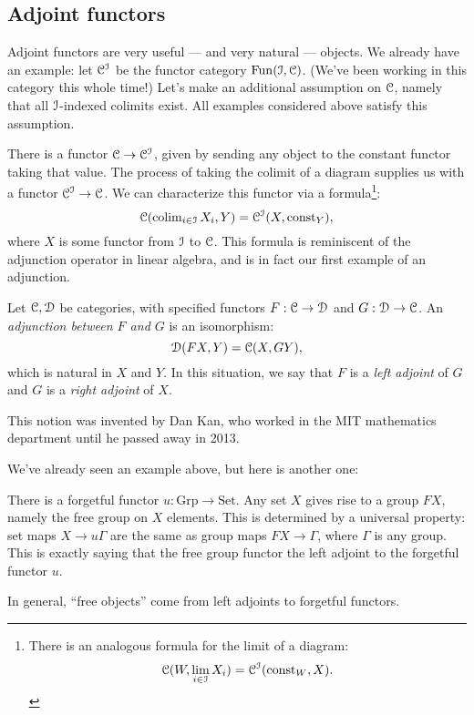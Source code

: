 \subsection{Adjoint functors}
Adjoint functors are very useful --- and very natural --- objects.
We already have an example: let $\mathcal C^\mathcal I$ be the functor category $\operatorname{Fun}(\mathcal I,\mathcal C)$.
(We've been working in this category this whole time!)
Let's make an additional assumption on $\mathcal C$, namely that all $\mathcal I$-indexed colimits exist.
All examples considered above satisfy this assumption.

There is a functor $\mathcal C\to \mathcal C^\mathcal I$, given by sending any object to the constant functor taking that value.
The process of taking the colimit of a diagram supplies us with a functor $\mathcal C^\mathcal I\to \mathcal C$.
We can characterize this functor via a formula\footnote{There is an analogous formula for the limit of a diagram:
$$\mathcal C(W,\lim_{i\in \mathcal I} X_i) = \mathcal C^{\mathcal I}(\mathrm{const}_W,X).$$}:
$$\mathcal C(\operatorname{colim}_{i\in \mathcal I} X_i,Y) = \mathcal C^\mathcal I(X,\mathrm{const}_Y),$$
where $X$ is some functor from $\mathcal I$ to $\mathcal C$.
This formula is reminiscent of the adjunction operator in linear algebra,
and is in fact our first example of an adjunction.

\begin{definition}
    Let $\mathcal C,\mathcal D$ be categories,
    with specified functors $F:\mathcal C\to \mathcal D$ and $G:\mathcal D\to\mathcal C$.
    An \emph{adjunction between $F$ and $G$} is an isomorphism:
    $$\mathcal D(FX,Y) = \mathcal C(X,GY),$$
    which is natural in $X$ and $Y$.
    In this situation, we say that $F$ is a \emph{left adjoint} of $G$ and $G$ is a \emph{right adjoint} of $X$.
\end{definition}
This notion was invented by Dan Kan, who worked in the MIT mathematics department until he passed away in 2013.

We've already seen an example above, but here is another one:
\begin{definition}
    There is a forgetful functor $u:\mathrm{Grp}\to\mathrm{Set}$.
    Any set $X$ gives rise to a group $FX$, namely the free group on $X$ elements.
    This is determined by a universal property:
    set maps $X\to u\Gamma$ are the same as group maps $FX\to \Gamma$,
    where $\Gamma$ is any group.
    This is exactly saying that the free group functor the left adjoint to the forgetful functor $u$.
\end{definition}
In general, ``free objects'' come from left adjoints to forgetful functors.


